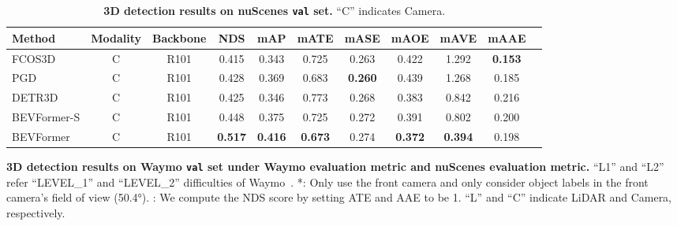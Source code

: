 \documentclass{article}
\begin{document}
\begin{table}[t]
\begin{center}
\caption{
\textbf{3D detection results on nuScenes \texttt{val} set.} ``C'' indicates Camera.
}

\setlength{\tabcolsep}{0.87mm}
\begin{tabular}{l  c c |c c| c c c c c c  }
\toprule
Method &  Modality & Backbone & NDS  & mAP  & mATE     & mASE     & mAOE     & mAVE    & mAAE    \\
\midrule


FCOS3D~\cite{wang2021fcos3d}&  C & R101& 0.415 & 0.343 & 0.725 & 0.263 & 0.422 & 1.292  &\textbf{0.153}  \\
PGD~\cite{wang2022probabilistic} & C &R101 & 0.428 &0.369 &0.683 &\textbf{0.260}& 0.439 &1.268 &0.185 \\
DETR3D~\cite{wang2022detr3d}& C& R101 & 0.425 &0.346 &0.773 &0.268 &0.383 &0.842 &0.216\\




\rowcolor{gray95}
BEVFormer-S & C & R101& 0.448 & 0.375 & 0.725 & 0.272 & 0.391 & 0.802 & 0.200\\
\rowcolor{gray9}
BEVFormer   & C & R101& \textbf{0.517}& \textbf{0.416} & \textbf{0.673} & 0.274 & \textbf{0.372} & \textbf{0.394} & 0.198 \\
\bottomrule
\end{tabular} \label{val_det}
\end{center}
\end{table}

\begin{table}[t] 
\begin{center}
\caption{\textbf{3D detection results  on Waymo \texttt{val} set under  Waymo evaluation metric and nuScenes evaluation metric.} ``L1'' and ``L2'' refer ``LEVEL\_1'' and ``LEVEL\_2'' difficulties of Waymo~\cite{sun2020scalability}. *:  Only use the
front camera and only consider object labels in the front camera’s field of view (50.4°).
: We compute the NDS score by setting ATE and AAE to be 1. ``L'' and ``C'' indicate LiDAR and Camera, respectively.
}

\setlength{\tabcolsep}{0.5mm}

\label{table:Waymo}
\end{center}
\end{table}
\end{document}
